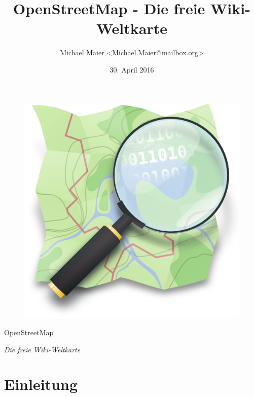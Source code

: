 \documentclass{beamer}
\title{OpenStreetMap - Die freie Wiki-Weltkarte}
\author{Michael Maier \textless Michael.Maier@mailbox.org\textgreater}
\date{30. April 2016}
\begin{document}

\begin{frame} 


\begin{figure}
  \centering
  \includegraphics[width=.5\textwidth]{mag_map.png}
\end{figure}

\begin{center}
\Huge{OpenStreetMap\\}
\end{center}

\begin{center}
\Large{\emph{Die freie Wiki-Weltkarte}}
\end{center}

\end{frame}


\section{Einleitung}
\end{document}
